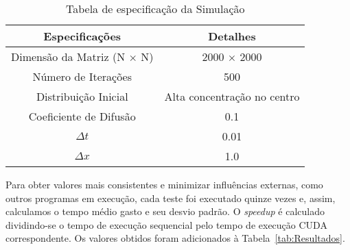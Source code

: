 \documentclass[12pt]{article}
\begin{document}
\begin{table}[htb]
  \centering
  \caption{Tabela de especificação da Simulação}
  \vspace{0.3cm}
  \begin{tabular}{||c c||}
    \hline
    Especificações                    & Detalhes                    \\ [0.5ex]
    \hline\hline
    Dimensão da Matriz (N $\times$ N) & 2000 $\times$ 2000          \\
    \hline
    Número de Iterações               & 500                         \\
    \hline
    Distribuição Inicial              & Alta concentração no centro \\
    \hline
    Coeficiente de Difusão            & 0.1                         \\
    \hline
    $\Delta t$                        & 0.01                        \\
    \hline
    $\Delta x$                        & 1.0                         \\
    \hline
  \end{tabular}\label{tab:especificacaoSimulacao}
\end{table}

Para obter valores mais consistentes e minimizar influências externas, como
outros programas em execução, cada teste foi executado quinze vezes e, assim,
calculamos o tempo médio gasto e seu desvio padrão. O \textit{speedup} é
calculado dividindo-se o tempo de execução sequencial pelo tempo de execução
CUDA correspondente. Os valores obtidos foram adicionados à Tabela~\ref{tab:Resultados}.
\end{document}
